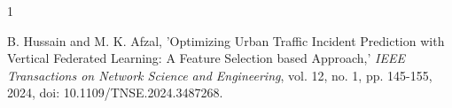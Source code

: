\documentclass[journal]{IEEEtran}
\begin{document}
\begin{thebibliography}{1}



B. Hussain and M. K. Afzal, 'Optimizing Urban Traffic Incident Prediction with Vertical Federated Learning: A Feature Selection based Approach,' \textit{IEEE Transactions on Network Science and Engineering}, vol. 12, no. 1, pp. 145-155, 2024, doi: 10.1109/TNSE.2024.3487268.






\end{thebibliography}







% 







\end{document}
